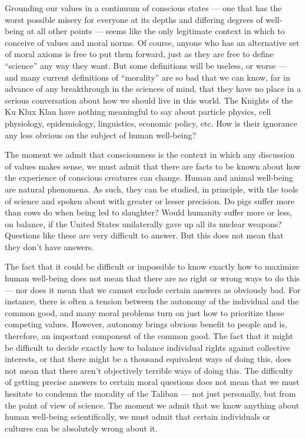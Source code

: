 \documentclass[a4paper,14pt]{extarticle}
\begin{document}
Grounding our values in a continuum of conscious states --- one that has the worst possible misery for everyone at its depths and differing degrees of well-being at all other points --- seems like the only legitimate context in which to conceive of values and moral norms.
Of course, anyone who has an alternative set of moral axioms is free to put them forward, just as they are free to define ``science'' any way they want.
But some definitions will be useless, or worse --- and many current definitions of ``morality'' are so bad that we can know, far in advance of any breakthrough in the sciences of mind, that they have no place in a serious conversation about how we should live in this world.
The Knights of the Ku Klux Klan have nothing meaningful to say about particle physics, cell physiology, epidemiology, linguistics, economic policy, etc.
How is their ignorance any less obvious on the subject of human well-being?

The moment we admit that consciousness is the context in which any discussion of values makes sense, we must admit that there are facts to be known about how the experience of conscious creatures can change.
Human and animal well-being are natural phenomena.
As such, they can be studied, in principle, with the tools of science and spoken about with greater or lesser precision.
Do pigs suffer more than cows do when being led to slaughter?
Would humanity suffer more or less, on balance, if the United States unilaterally gave up all its nuclear weapons?
Questions like these are very difficult to answer.
But this does not mean that they don't have answers.

The fact that it could be difficult or impossible to know exactly how to maximize human well-being does not mean that there are no right or wrong ways to do this --- nor does it mean that we cannot exclude certain answers as obviously bad.
For instance, there is often a tension between the autonomy of the individual and the common good, and many moral problems turn on just how to prioritize these competing values.
However, autonomy brings obvious benefit to people and is, therefore, an important component of the common good.
The fact that it might be difficult to decide exactly how to balance individual rights against collective interests, or that there might be a thousand equivalent ways of doing this, does not mean that there aren't objectively terrible ways of doing this.
The difficulty of getting precise answers to certain moral questions does not mean that we must hesitate to condemn the morality of the Taliban --- not just personally, but from the point of view of science.
The moment we admit that we know anything about human well-being scientifically, we must admit that certain individuals or cultures can be absolutely wrong about it.
\end{document}
